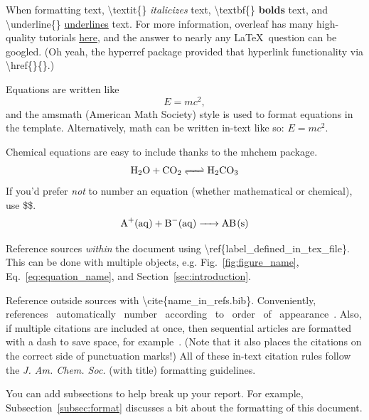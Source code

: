 When formatting text, \textbackslash textit\{\} \textit{italicizes} text, \textbackslash textbf\{\} \textbf{bolds} text, and \textbackslash underline\{\} \underline{underlines} text. For more information, overleaf has many high-quality tutorials \href{https://www.overleaf.com/learn/latex/Tutorials}{here}, and the answer to nearly any \LaTeX\ question can be googled. (Oh yeah, the hyperref package provided that hyperlink functionality via \textbackslash href\{\}\{\}.)  

Equations are written like
\begin{equation}
    \label{eq:equation_name}
    E = mc^2, 
\end{equation}
and the amsmath (American Math Society) style is used to format equations in the template. Alternatively, math can be written in-text like so: $E=mc^2$. 

Chemical equations are easy to include thanks to the mhchem package. 
\begin{equation}
    \label{eq:carbonic_acid_equilibrium}
    \ce{ 
    H2O + CO2 <=> H2CO3
    }
\end{equation}
If you'd prefer \textit{not} to number an equation (whether mathematical or chemical), use \$\$.
$$ \ce{ A+(aq) + B-(aq) -> AB(s) } $$

Reference sources \textit{within} the document using \textbackslash ref\{label\_defined\_in\_tex\_file\}. This can be done with multiple objects, e.g. Fig.~\ref{fig:figure_name}, Eq.~\ref{eq:equation_name}, and Section~\ref{sec:introduction}. 

Reference outside sources with \textbackslash cite\{name\_in\_refs.bib\}. Conveniently, references~\cite{youssef_scalable_2021} automatically~\cite{sood_coupling_2022} number~\cite{schuette_decorrelating_2023} according~\cite{schuette_applying_2020} to~\cite{youssef_scalable_2023} order~\cite{schuette_efficient_2023} of~\cite{zhang_topology_2015} appearance~\cite{zhang_shape_2016}. Also, if multiple citations are included at once, then sequential articles are formatted with a dash to save space, for example~\cite{sood_coupling_2022,youssef_scalable_2021,schuette_decorrelating_2023,youssef_scalable_2023,schuette_efficient_2023,zhang_topology_2015,zhang_shape_2016,schuette_applying_2020}. (Note that it also places the citations on the correct side of punctuation marks!) All of these in-text citation rules follow the \textit{J. Am. Chem. Soc.} (with title) formatting guidelines. 

You can add subsections to help break up your report. For example, Subsection~\ref{subsec:format} discusses a bit about the formatting of this document. 

